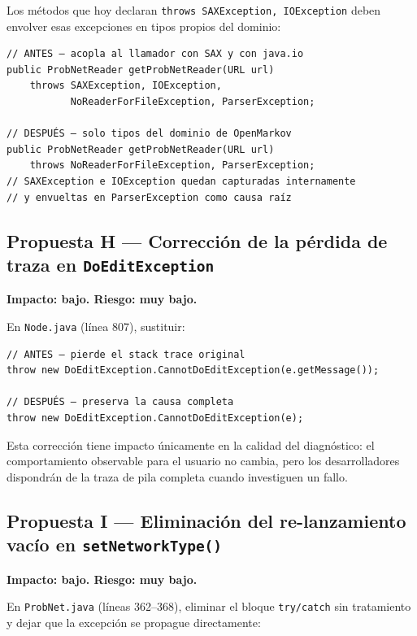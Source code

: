 \documentclass[11pt,a4paper]{article}
\begin{document}
Los métodos que hoy declaran \texttt{throws SAXException, IOException} deben envolver esas
excepciones en tipos propios del dominio:

\begin{lstlisting}[caption={API limpia — sin exposición de detalles de implementación},label={lst:api-clean}]
// ANTES — acopla al llamador con SAX y con java.io
public ProbNetReader getProbNetReader(URL url)
    throws SAXException, IOException,
           NoReaderForFileException, ParserException;

// DESPUÉS — solo tipos del dominio de OpenMarkov
public ProbNetReader getProbNetReader(URL url)
    throws NoReaderForFileException, ParserException;
// SAXException e IOException quedan capturadas internamente
// y envueltas en ParserException como causa raíz
\end{lstlisting}

\subsection{Propuesta H — Corrección de la pérdida de traza en \texttt{DoEditException}}

\textbf{Impacto: bajo. Riesgo: muy bajo.}

En \texttt{Node.java} (línea 807), sustituir:

\begin{lstlisting}[caption={Corrección de la causa raíz perdida en \texttt{Node.java}},label={lst:node-fix}]
// ANTES — pierde el stack trace original
throw new DoEditException.CannotDoEditException(e.getMessage());

// DESPUÉS — preserva la causa completa
throw new DoEditException.CannotDoEditException(e);
\end{lstlisting}

Esta corrección tiene impacto únicamente en la calidad del diagnóstico: el comportamiento
observable para el usuario no cambia, pero los desarrolladores dispondrán de la traza de pila
completa cuando investiguen un fallo.

\subsection{Propuesta I — Eliminación del re-lanzamiento vacío en \texttt{setNetworkType()}}

\textbf{Impacto: bajo. Riesgo: muy bajo.}

En \texttt{ProbNet.java} (líneas 362--368), eliminar el bloque \texttt{try/catch} sin
tratamiento y dejar que la excepción se propague directamente:
\end{document}
